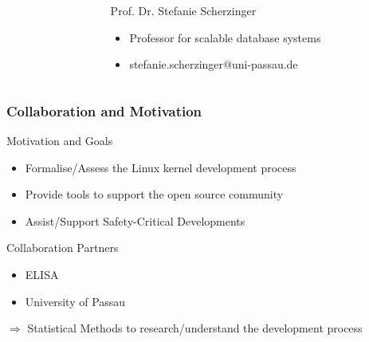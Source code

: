 \documentclass{beamer}
\begin{document}
\begin{frame}
\begin{minipage}[c]{1.0\linewidth}
\begin{columns}
\begin{column}{0.35\textwidth}
\begin{center}
			\end{center}
		\end{column}
		\begin{column}{0.7\textwidth}
		\begin{block}{Prof. Dr. Stefanie Scherzinger}
			\begin{itemize}
				\item Professor for scalable database systems
				\item stefanie.scherzinger@uni-passau.de
			\end{itemize}
		\end{block}
		\end{column}
		\end{columns}
	\end{minipage}
	\end{frame}


	\begin{frame}
	\frametitle{Collaboration and Motivation}
		\begin{block}{Motivation and Goals}
			\begin{itemize}
				\item Formalise/Assess the Linux kernel development process
				\item Provide tools to support the open source community
				\item Assist/Support Safety-Critical Developments
			\end{itemize}
		\end{block}
		\begin{block}{Collaboration Partners}
			\begin{itemize}
				\item ELISA
				\item University of Passau
			\end{itemize}
		\end{block}
		$\Rightarrow$ Statistical Methods to research/understand the development process
	\end{frame}
\end{document}
